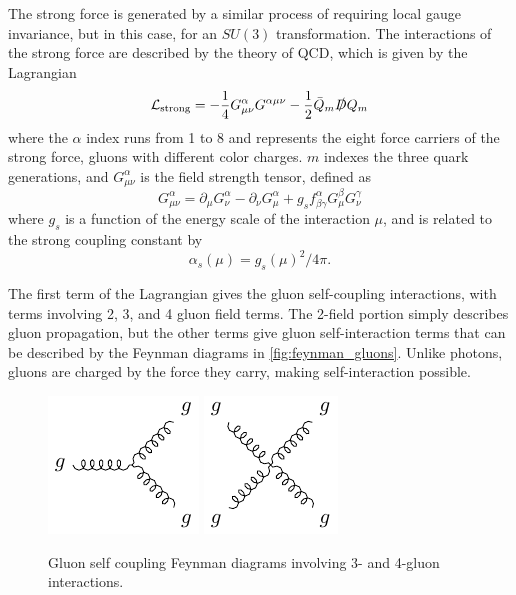 The strong force is generated by a similar process of requiring local gauge invariance, but in this case, for an $SU(3)$ transformation. The interactions of the strong force are described by the theory of \ac{QCD}, which is given by the Lagrangian
%
\begin{equation}
\mathcal{L}_\text{strong} = -\frac{1}{4}G^\alpha_{\mu\nu}G^{\alpha\mu\nu} - \frac{1}{2}\bar{Q}_m \slashed{D} Q_m
\end{equation}
%
where the $\alpha$ index runs from 1 to 8 and represents the eight force carriers of the strong force, gluons with different color charges. $m$ indexes the three quark generations, and $G^\alpha_{\mu\nu}$ is the field strength tensor, defined as
%
\begin{equation}
G^\alpha_{\mu\nu} = \partial_\mu G^\alpha_\nu - \partial_\nu G^\alpha_\mu + g_s f^\alpha_{\beta\gamma}G^\beta_\mu G^\gamma_\nu
\end{equation}
%
where $g_s$ is a function of the energy scale of the interaction $\mu$, and is related to the strong coupling constant by
%
\begin{equation}
\alpha_s(\mu) =  g_s(\mu)^2 / 4\pi . 
\end{equation}

The first term of the Lagrangian gives the gluon self-coupling interactions, with terms involving 2, 3, and 4 gluon field terms. The 2-field portion simply describes gluon propagation, but the other terms give gluon self-interaction terms that can be described by the Feynman diagrams in \autoref{fig:feynman_gluons}. Unlike photons, gluons are charged by the force they carry, making self-interaction possible. 

\begin{centering}
\begin{figure}[!hbt]
\myfloatalign
\includegraphics[width=.45\linewidth]{feynman/gluon_3.pdf}
\includegraphics[width=.4\linewidth]{feynman/gluon_4.pdf}
\caption{Gluon self coupling Feynman diagrams involving 3- and 4-gluon interactions.}
\label{fig:feynman_gluons}
\end{figure}
\end{centering}

